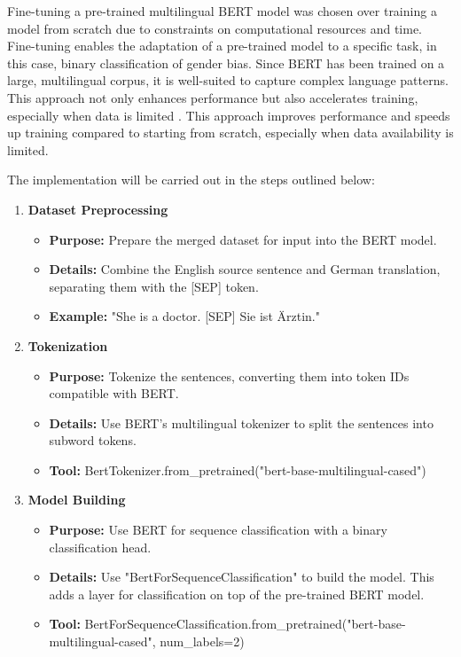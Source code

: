 \begin{description}
Fine-tuning a pre-trained multilingual BERT model was chosen over training a model from scratch due to constraints on computational resources and time. Fine-tuning enables the adaptation of a pre-trained model to a specific task, in this case, binary classification of gender bias. Since BERT has been trained on a large, multilingual corpus, it is well-suited to capture complex language patterns. This approach not only enhances performance but also accelerates training, especially when data is limited \parencite{devlin_bert_2019}. This approach improves performance and speeds up training compared to starting from scratch, especially when data availability is limited.

The implementation will be carried out in the steps outlined below:

\begin{enumerate}
    \item \textbf{Dataset Preprocessing}
    \begin{itemize}
        \item \textbf{Purpose:} Prepare the merged dataset for input into the BERT model. 
        \item \textbf{Details:} Combine the English source sentence and German translation, separating them with the [SEP] token.
        \item \textbf{Example:} "She is a doctor. [SEP] Sie ist Ärztin."
    \end{itemize}
    
    \item \textbf{Tokenization}
    \begin{itemize}
        \item \textbf{Purpose:} Tokenize the sentences, converting them into token IDs compatible with BERT.
        \item \textbf{Details:} Use BERT’s multilingual tokenizer to split the sentences into subword tokens.
        \item \textbf{Tool:} BertTokenizer.from\_pretrained("bert-base-multilingual-cased")
    \end{itemize}

    \item \textbf{Model Building}
    \begin{itemize}
        \item \textbf{Purpose:} Use BERT for sequence classification with a binary classification head.
        \item \textbf{Details:} Use "BertForSequenceClassification" to build the model. This adds a layer for classification on top of the pre-trained BERT model.
        \item \textbf{Tool:} BertForSequenceClassification.from\_pretrained("bert-base-multilingual-cased",  num\_labels=2)
    \end{itemize}
    

\end{enumerate}
\end{description}
